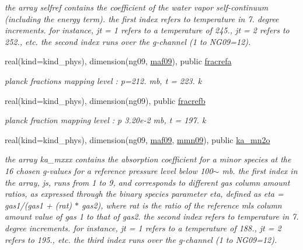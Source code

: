 \begin{Indent}
\begin{DoxyCompactItemize}
\begin{DoxyCompactList}\small\item\em the array selfref contains the coefficient of the water vapor self-\/continuum (including the energy term). the first index refers to temperature in 7. degree increments. for instance, jt = 1 refers to a temperature of 245., jt = 2 refers to 252., etc. the second index runs over the g-\/channel (1 to N\+G09=12). \end{DoxyCompactList}\item 
real(kind=kind\+\_\+phys), dimension(ng09, \hyperlink{group__module__radlw__kgbnn_ga7d5d565c87af7ef07dc17930f9cb9e57}{maf09}), public \hyperlink{group__module__radlw__kgbnn_gace3d3e2731609f7ea50eb798bd212f3b}{fracrefa}
\begin{DoxyCompactList}\small\item\em planck fractions mapping level \+: p=212. mb, t = 223. k \end{DoxyCompactList}\item 
real(kind=kind\+\_\+phys), dimension(ng09), public \hyperlink{group__module__radlw__kgbnn_ga26476f00fe13c1c81d3ae0cf8e43c90b}{fracrefb}
\begin{DoxyCompactList}\small\item\em planck fraction mapping level \+: p 3.\+20e-\/2 mb, t = 197. k \end{DoxyCompactList}\item 
real(kind=kind\+\_\+phys), dimension(ng09, \hyperlink{group__module__radlw__kgbnn_ga7d5d565c87af7ef07dc17930f9cb9e57}{maf09}, \hyperlink{group__module__radlw__kgbnn_gaa9c8294b56ac3ce90b07114e986777a9}{mmn09}), public \hyperlink{group__module__radlw__kgbnn_ga37d98e8066c5995060a2a8451b45705f}{ka\+\_\+mn2o}
\begin{DoxyCompactList}\small\item\em the array ka\+\_\+mxxx contains the absorption coefficient for a minor species at the 16 chosen g-\/values for a reference pressure level below 100$\sim$ mb. the first index in the array, js, runs from 1 to 9, and corresponds to different gas column amount ratios, as expressed through the binary species parameter eta, defined as eta = gas1/(gas1 + (rat) $\ast$ gas2), where rat is the ratio of the reference mls column amount value of gas 1 to that of gas2. the second index refers to temperature in 7. degree increments. for instance, jt = 1 refers to a temperature of 188., jt = 2 refers to 195., etc. the third index runs over the g-\/channel (1 to N\+G09=12). \end{DoxyCompactList}\item 

\end{DoxyCompactItemize}
\end{Indent}
